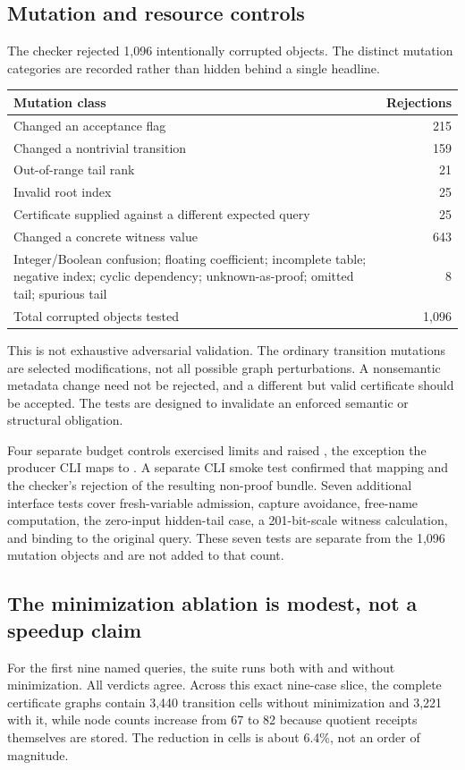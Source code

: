 \subsection{Mutation and resource controls}
The checker rejected 1,096 intentionally corrupted objects. The distinct mutation categories are recorded rather than hidden behind a single headline.
\begin{center}
\begin{tabularx}{\linewidth}{@{}Xr@{}}
\toprule
Mutation class & Rejections\\
\midrule
Changed an acceptance flag & 215\\
Changed a nontrivial transition & 159\\
Out-of-range tail rank & 21\\
Invalid root index & 25\\
Certificate supplied against a different expected query & 25\\
Changed a concrete witness value & 643\\
Integer/Boolean confusion; floating coefficient; incomplete table; negative index; cyclic dependency; unknown-as-proof; omitted tail; spurious tail & 8\\
\midrule
Total corrupted objects tested & 1,096\\
\bottomrule
\end{tabularx}
\end{center}

This is not exhaustive adversarial validation. The ordinary transition mutations are selected modifications, not all possible graph perturbations. A nonsemantic metadata change need not be rejected, and a different but valid certificate should be accepted. The tests are designed to invalidate an enforced semantic or structural obligation.

Four separate budget controls exercised limits and raised , the exception the producer CLI maps to . A separate CLI smoke test confirmed that mapping and the checker's rejection of the resulting non-proof bundle. Seven additional interface tests cover fresh-variable admission, capture avoidance, free-name computation, the zero-input hidden-tail case, a 201-bit-scale witness calculation, and binding to the original query. These seven tests are separate from the 1,096 mutation objects and are not added to that count.

\subsection{The minimization ablation is modest, not a speedup claim}
For the first nine named queries, the suite runs both with and without minimization. All verdicts agree. Across this exact nine-case slice, the complete certificate graphs contain 3,440 transition cells without minimization and 3,221 with it, while node counts increase from 67 to 82 because quotient receipts themselves are stored. The reduction in cells is about 6.4\%, not an order of magnitude.

